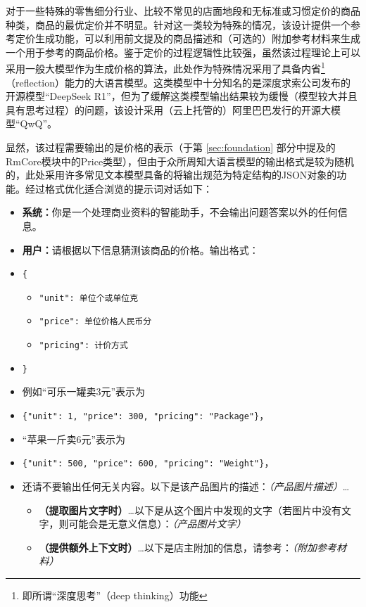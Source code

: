 对于一些特殊的零售细分行业、比较不常见的店面地段和无标准或习惯定价的商品种类，商品的最优定价并不明显。针对这一类较为特殊的情况，该设计提供一个参考定价生成功能，可以利用前文提及的商品描述和（可选的）附加参考材料来生成一个用于参考的商品价格。鉴于定价的过程逻辑性比较强，虽然该过程理论上可以采用一般大模型作为生成价格的算法，此处作为特殊情况采用了具备内省\footnote{即所谓“深度思考”（deep thinking）功能}（reflection）能力的大语言模型。这类模型中十分知名的是深度求索公司发布的开源模型“DeepSeek R1”，但为了缓解这类模型输出结果较为缓慢（模型较大并且具有思考过程）的问题，该设计采用（云上托管的）阿里巴巴发行的开源大模型“QwQ”。

显然，该过程需要输出的是价格的表示（于第 \ref{sec:foundation} 部分中提及的RmCore模块中的Price类型），但由于众所周知大语言模型的输出格式是较为随机的，此处采用许多常见文本模型具备的将输出规范为特定结构的JSON对象的功能。经过格式优化适合浏览的提示词对话如下：

\begin{itemize}
    \item[] \textbf{系统：}你是一个处理商业资料的智能助手，不会输出问题答案以外的任何信息。
    \item[] \textbf{用户：}请根据以下信息猜测该商品的价格。输出格式：
    \item[] \verb|{|
    \begin{itemize}
        \item[] \verb|"unit": 单位个或单位克|
        \item[] \verb|"price": 单位价格人民币分|
        \item[] \verb|"pricing": 计价方式|
    \end{itemize}
    \item[] \verb|}|
    \item[] 例如“可乐一罐卖3元”表示为
    \item[] \verb|{"unit": 1, "price": 300, "pricing": "Package"}|，
    \item[] “苹果一斤卖6元”表示为
    \item[] \verb|{"unit": 500, "price": 600, "pricing": "Weight"}|，
    \item[] 还请不要输出任何无关内容。以下是该产品图片的描述：\textit{（产品图片描述）}\dots
    \begin{itemize}
        \item[] \textbf{（提取图片文字时）}\dots 以下是从这个图片中发现的文字（若图片中没有文字，则可能会是无意义信息）：\textit{（产品图片文字）}
        \item[] \textbf{（提供额外上下文时）}\dots 以下是店主附加的信息，请参考：\textit{（附加参考材料）}
    \end{itemize}
\end{itemize}

